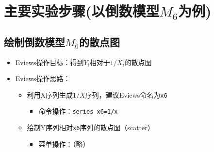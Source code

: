 \documentclass[12pt,(landscape,a4paper),(portrait,a4paper)]{article}
\providecommand{\tightlist}{%
  \setlength{\itemsep}{0pt}\setlength{\parskip}{0pt}}
\let\stdsection\section
\renewcommand\section{\newpage\stdsection}
\begin{document}
\hypertarget{m_6}{%
\section{\texorpdfstring{主要实验步骤(以倒数模型\(M_6\)为例)}{主要实验步骤(以倒数模型M\_6为例)}}\label{m_6}}

\hypertarget{m_6}{%
\subsection{\texorpdfstring{绘制倒数模型\(M_6\)的散点图}{绘制倒数模型M\_6的散点图}}\label{m_6}}

\begin{itemize}
\item
  Eviews操作目标：得到\(Y_i\)相对于\(1/X_i\)的散点图
\item
  Eviews操作思路：

  \begin{itemize}
  \tightlist
  \item
    利用X序列生成\(1/X\)序列，建议Eviews命名为\texttt{x6}

    \begin{itemize}
    \tightlist
    \item
      命令操作：\texttt{series\ x6=1/x}
    \end{itemize}
  \item
    绘制Y序列相对\texttt{x6}序列的散点图（scatter）

    \begin{itemize}
    \tightlist
    \item
      菜单操作：（略）
    \end{itemize}
  \end{itemize}
\end{itemize}
\end{document}
